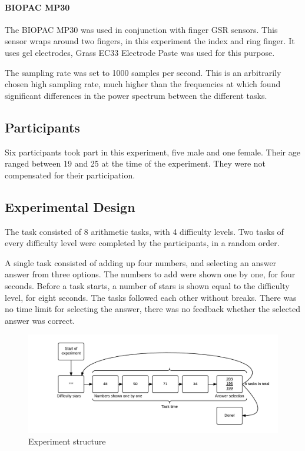 \documentclass[11pt,leqno,a4paper]{report} %
\begin{document}
\paragraph{BIOPAC MP30}
The BIOPAC MP30 was used in conjunction with finger GSR sensors. This sensor wraps around two fingers, in this experiment the index and ring finger. It uses gel electrodes, Grass EC33 Electrode Paste was used for this purpose.

The sampling rate was set to 1000 samples per second. This is an arbitrarily chosen high sampling rate, much higher than the frequencies at which \citet{Nourbakhsh2012} found significant differences in the power spectrum between the different tasks.

\subsection{Participants}
Six participants took part in this experiment, five male and one female. Their age ranged between 19 and 25 at the time of the experiment. They were not compensated for their participation.


\subsection{Experimental Design}
The task consisted of 8 arithmetic tasks, with 4 difficulty levels. Two tasks of every difficulty level were completed by the participants, in a random order. 

A single task consisted of adding up four numbers, and selecting an answer answer from three options. The numbers to add were shown one by one, for four seconds. Before a task starts, a number of stars is shown equal to the difficulty level, for eight seconds. The tasks followed each other without breaks. There was no time limit for selecting the answer, there was no feedback whether the selected answer was correct.

\begin{figure}[H]
  \centering
 	\hspace*{-.25\textwidth}   
 	\includegraphics[width=1.5\textwidth]{experiment.png}
  \caption{Experiment structure}
\end{figure}
\end{document}

